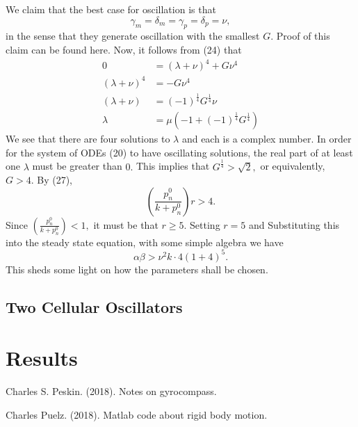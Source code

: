 \documentclass[12pt]{article}
\renewcommand{\(}{\left (}
\renewcommand{\)}{\right )}
\begin{document}
We claim that the best case for oscillation is that
\begin{equation}
    \gamma_m = \delta_m = \gamma_p = \delta_p = \nu,
\end{equation}
in the sense that they generate oscillation with the smallest $G.$ Proof of this claim can be found here. Now, it follows from (24) that
\begin{align}
    0 &= (\lambda + \nu)^4 + G \nu ^4 \\
    (\lambda + \nu)^4 &= -G \nu ^4 \\
    (\lambda + \nu) &= (-1)^\frac{1}{4} G ^\frac{1}{4}\nu\\
    \lambda &= \mu (-1 + (-1)^\frac{1}{4} G ^\frac{1}{4})
\end{align}
We see that there are four solutions to $\lambda$ and each is a complex number. In order for the system of ODEs (20) to have oscillating solutions, the real part of at least one $\lambda$ must be greater than $0.$ This implies that $G^\frac{1}{4} > \sqrt{2},$ or equivalently, $G>4.$ By (27), \begin{equation}
    \left(\frac{p_n^0}{k+p_n^0}\right) r > 4.
\end{equation}
Since $ \left(\frac{p_n^0}{k+p_n^0}\right) < 1,$ it must be that $r\geq 5.$ Setting $r=5$ and Substituting this into the steady state equation, with some simple algebra we have
\begin{equation}
    \alpha \beta > \nu^2 k \cdot 4(1+4)^5.
\end{equation}
This sheds some light on how the parameters shall be chosen.

\subsection{Two Cellular Oscillators}

\section{Results}


\begin{thebibliography}{9}

	Charles S. Peskin. (2018).
	Notes on gyrocompass.

	Charles Puelz. (2018).
	Matlab code about rigid body motion.




\end{thebibliography}
\end{document}
